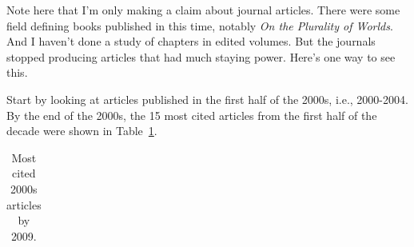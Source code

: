 \documentclass[
  10pt,
  letterpaper,
  DIV=11,
  numbers=noendperiod,
  twoside]{scrartcl}
\begin{document}
Note here that I'm only making a claim about journal articles. There
were some field defining books published in this time, notably \emph{On
the Plurality of Worlds}. And I haven't done a study of chapters in
edited volumes. But the journals stopped producing articles that had
much staying power. Here's one way to see this.

Start by looking at articles published in the first half of the 2000s,
i.e., 2000-2004. By the end of the 2000s, the 15 most cited articles
from the first half of the decade were shown in
Table~\ref{tbl-early-2000s}.

\begin{longtable}[]{@{}
  >{\raggedright\arraybackslash}p{}
  >{\raggedleft\arraybackslash}p{}@{}}

\caption{\label{tbl-early-2000s}Most cited 2000s articles by 2009.}

\tabularnewline


\end{longtable}
\end{document}
